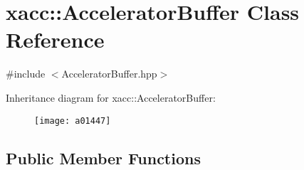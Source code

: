 \hypertarget{a01447}{}\section{xacc\+:\+:Accelerator\+Buffer Class Reference}
\label{a01447}


{\ttfamily \#include $<$Accelerator\+Buffer.\+hpp$>$}

Inheritance diagram for xacc\+:\+:Accelerator\+Buffer\+:\begin{figure}[H]
\begin{center}
\leavevmode
\texttt{[image: a01447]}
\end{center}
\end{figure}
\subsection*{Public Member Functions}
